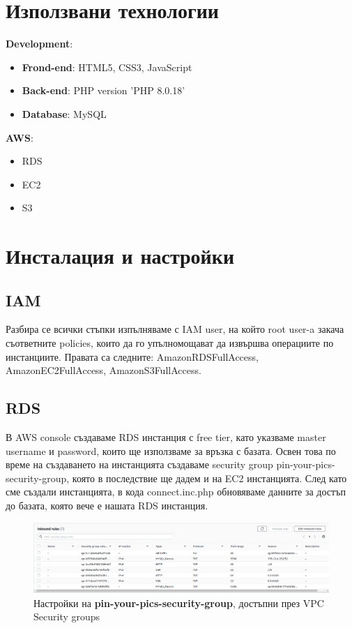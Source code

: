 \documentclass[12pt]{article}
\begin{document}

\section{Използвани технологии}
\textbf {Development}:
\begin{itemize}
\item \textbf{Frond-end}: HTML5, CSS3, JavaScript
\item \textbf{Back-end}: PHP version 'PHP 8.0.18'
\item \textbf{Database}: MySQL
\end{itemize}
\textbf{AWS}:
\begin{itemize}
\item  RDS
\item  EC2
\item  S3
\end{itemize}

\newpage

\section{Инсталация и настройки}
\subsection{IAM}
Разбира се всички стъпки изпълняваме с IAM user, на който root user-a закача съответните policies, които да го упълномощават да извършва операциите по инстанциите. Правата са следните: AmazonRDSFullAccess, AmazonEC2FullAccess, AmazonS3FullAccess.
\subsection{RDS}
  В AWS console създаваме RDS инстанция с free tier, като указваме master username и password, които ще използваме за връзка с базата. Освен това по време на създаването на инстанцията създаваме security group pin-your-pics-security-group, която в последствие ще дадем и на EC2 инстанцията. След като сме създали инстанцията, в кода connect.inc.php обновяваме данните за достъп до базата, която вече е нашата RDS инстанция. 

\begin{figure}[!htb]
    \centering
        \includegraphics[scale=0.30]{inbound-rules.png}
        \caption{Настройки на \textbf{pin-your-pics-security-group}, достъпни през VPC Security groups}
\end{figure}
\end{document}

